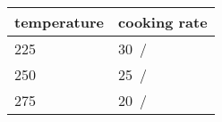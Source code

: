 \begin{center}
	\begin{tabular}{ll}\toprule
		\textbf{temperature}  &  \textbf{cooking rate} \\ \midrule
		225~\Fahrenheit       &  30~\minute/\pound\\
		250~\Fahrenheit       &  25~\minute/\pound\\
		275~\Fahrenheit       &  20~\minute/\pound\\ \bottomrule
	\end{tabular}
\end{center}


\recipeend%
